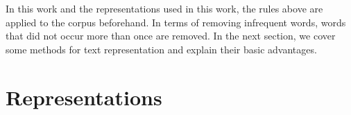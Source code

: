 




In this work and the representations used in this work, the  rules above are applied to the corpus beforehand. %
In terms of removing infrequent words, words that did not occur more than once are removed.  %
In the next section, we cover some  methods for text representation and explain their basic advantages.  %

\section{Representations}\label{ch2:representations}




